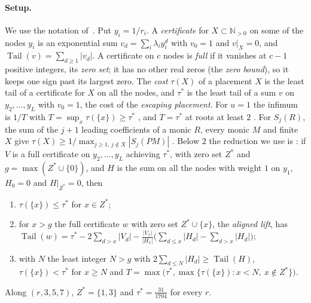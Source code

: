 \documentclass[11pt]{article}
\newcommand{\N}{\mathbb N}
\DeclareMathOperator{\Tail}{Tail}
\begin{document}
\paragraph{Setup.}  We use the notation
of~\cite{coefficient-mass-attainment}.  Put $y_i=1/r_i$.  A
\emph{certificate} for $X\subset\N_{>0}$ on some of the nodes $y_i$ is an
exponential sum $v_d=\sum_i\lambda_iy_i^d$ with $v_0=1$ and $v|_X=0$, and
$\Tail(v)=\sum_{d\ge1}|v_d|$.  A certificate on $c$ nodes is \emph{full} if
it vanishes at $c-1$ positive integers, its \emph{zero set}; it has no other
real zeros (the \emph{zero bound}), so it keeps one sign past its largest
zero.  The \emph{cost} $\tau(X)$ of a placement $X$ is the least tail of a
certificate for $X$ on all the nodes, and $\tau^*$ is the least tail of a
sum $v$ on $y_2,\ldots,y_L$ with $v_0=1$, the cost of the \emph{escaping
placement}.  For $u=1$ the infimum is $1/T$ with
$T=\sup_x\tau(\{x\})\ge\tau^*$ \cite[Theorem~3.1]{coefficient-mass-attainment},
and $T=\tau^*$ at roots at least $2$
\cite[Theorem~4.3]{coefficient-mass-attainment}.  For
$S_j(R)$, the sum of the $j+1$ leading coefficients of a monic $R$, every
monic $M$ and finite $X$ give
$\tau(X)\ge1/\max_{j\ge1,\,j\notin X}|S_j(PM)|$
\cite[Lemma~5.1]{coefficient-mass-attainment}.  Below $2$ the reduction we
use is \cite[Theorem~5.3]{coefficient-mass-attainment}: if $V$ is a full
certificate on $y_2,\ldots,y_L$ achieving $\tau^*$, with zero set $Z^*$ and
$g=\max(Z^*\cup\{0\})$, and $H$ is the sum on all the nodes with weight $1$
on $y_1$, $H_0=0$ and $H|_{Z^*}=0$, then
\begin{enumerate}
\item[(a)] $\tau(\{x\})\le\tau^*$ for $x\in Z^*$;
\item[(b)] for $x>g$ the full certificate $w$ with zero set $Z^*\cup\{x\}$,
the \emph{aligned lift}, has
$\Tail(w)=\tau^*-2\sum_{d>x}|V_d|
-\frac{|V_x|}{|H_x|}\bigl(\sum_{d\le x}|H_d|-\sum_{d>x}|H_d|\bigr)$;
\item[(c)] with $N$ the least integer $N>g$ with
$2\sum_{d\le N}|H_d|\ge\Tail(H)$, $\tau(\{x\})<\tau^*$ for $x\ge N$ and
$T=\max\bigl(\tau^*,\max\{\tau(\{x\}):x<N,\ x\notin Z^*\}\bigr)$.
\end{enumerate}
Along $(r,3,5,7)$, $Z^*=\{1,3\}$ and
$\tau^*=\tfrac{31}{1704}$ for every $r$.
\end{document}
